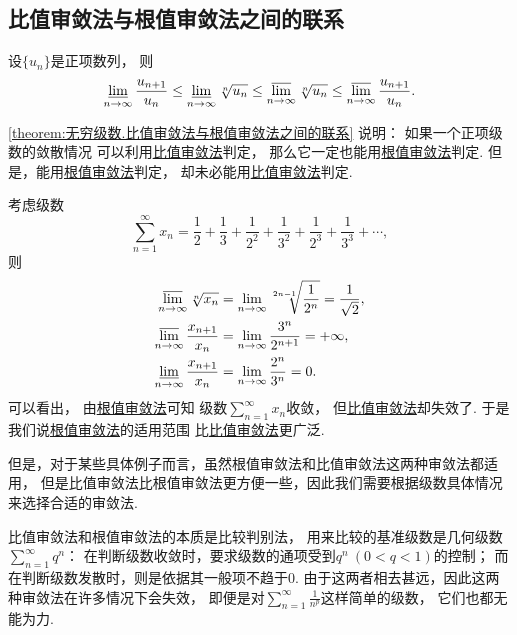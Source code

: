 \subsection{比值审敛法与根值审敛法之间的联系}
\begin{theorem}\label{theorem:无穷级数.比值审敛法与根值审敛法之间的联系}
设\(\{u_n\}\)是正项数列，
则\[
	\varliminf_{n\to\infty} \frac{u_{n+1}}{u_n}
	\leq
	\varliminf_{n\to\infty} \sqrt[n]{u_n}
	\leq
	\varlimsup_{n\to\infty} \sqrt[n]{u_n}
	\leq
	\varlimsup_{n\to\infty} \frac{u_{n+1}}{u_n}.
\]
\end{theorem}
\begin{remark}
\cref{theorem:无穷级数.比值审敛法与根值审敛法之间的联系} 说明：
如果一个正项级数的敛散情况
可以利用\hyperref[theorem:无穷级数.正项级数的比值审敛法]{比值审敛法}判定，
那么它一定也能用\hyperref[theorem:无穷级数.正项级数的根值审敛法]{根值审敛法}判定.
但是，能用\hyperref[theorem:无穷级数.正项级数的根值审敛法]{根值审敛法}判定，
却未必能用\hyperref[theorem:无穷级数.正项级数的比值审敛法]{比值审敛法}判定.
\end{remark}

\begin{example}
考虑级数\[
	\sum_{n=1}^\infty x_n
	= \frac12 + \frac13
	+ \frac1{2^2} + \frac1{3^2}
	+ \frac1{2^3} + \frac1{3^3}
	+ \dotsb,
\]
则\begin{align*}
	\varlimsup_{n\to\infty} \sqrt[n]{x_n}
	&= \lim_{n\to\infty} \sqrt[2n-1]{\frac1{2^n}}
	= \frac1{\sqrt2}, \\
	\varlimsup_{n\to\infty} \frac{x_{n+1}}{x_n}
	&= \lim_{n\to\infty} \frac{3^n}{2^{n+1}}
	= +\infty, \\
	\varliminf_{n\to\infty} \frac{x_{n+1}}{x_n}
	&= \lim_{n\to\infty} \frac{2^n}{3^n}
	= 0.
\end{align*}
可以看出，
由\hyperref[theorem:无穷级数.正项级数的根值审敛法]{根值审敛法}可知
级数\(\sum_{n=1}^\infty x_n\)收敛，
但\hyperref[theorem:无穷级数.正项级数的比值审敛法]{比值审敛法}却失效了.
于是我们说\hyperref[theorem:无穷级数.正项级数的根值审敛法]{根值审敛法}的适用范围
比\hyperref[theorem:无穷级数.正项级数的比值审敛法]{比值审敛法}更广泛.
\end{example}

但是，对于某些具体例子而言，虽然根值审敛法和比值审敛法这两种审敛法都适用，
但是比值审敛法比根值审敛法更方便一些，因此我们需要根据级数具体情况来选择合适的审敛法.

比值审敛法和根值审敛法的本质是比较判别法，
用来比较的基准级数是几何级数\(\sum_{n=1}^\infty q^n\)：
在判断级数收敛时，要求级数的通项受到\(q^n\ (0<q<1)\)的控制；
而在判断级数发散时，则是依据其一般项不趋于\(0\).
由于这两者相去甚远，因此这两种审敛法在许多情况下会失效，
即便是对\(\sum_{n=1}^\infty \frac1{n^p}\)这样简单的级数，
它们也都无能为力.

